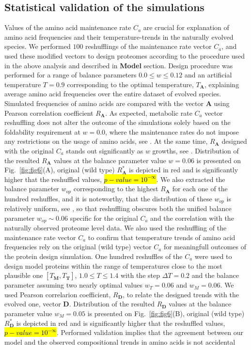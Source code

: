 \documentclass[10pt,letterpaper]{article}
\begin{document}
\subsection{Statistical validation of the simulations}
Values of the amino acid maintenance rate $C_{a}$ are crucial for explanation of amino acid frequencies and their temperature-trends in the naturally evolved species. We performed $100$ reshufflings of the maintenance rate vector $C_{a}$, and used these modified vectors to design proteomes according to the procedure used in the above analysis and described in {\bf Model} section. Design procedure was performed for a range of balance parameters $0.0\leq\mathit{w}\leq0.12$ and an artificial temperature $T=0.9$ corresponding to the optimal temperature, $T_{\mathbf{A}}$, explaining average amino acid frequencies over the entire dataset of evolved species. Simulated frequencies of amino acids are compared with the vector $\mathbf{A}$ using Pearson correlation coefficient $R_{\mathbf{A}}$. As expected, metabolic rate $C_{a}$ vector reshuffling does not alter the outcome of the simulations solely based on the foldability requirement at $\mathit{w}=0.0$, where the maintenance rates do not impose any restrictions on the usage of amino acids, see . At the same time, $R_{\mathbf{A}}$ designed with the original $C_{a}$ stands out significantly as $\mathit{w}$ growths, see . Distribution of the resulted $R_{\mathbf{A}}$ values at the balance parameter value $\mathit{w}=0.06$ is presented on Fig.~\ref{fig:fig6}(A), original (wild type) $R^{*}_{\mathbf{A}}$ is depicted in red and is significantly higher that the reshuffled values, \hl{$p-value=10^{-\infty}$}. We also extracted the balance parameter $\mathit{w}_{op}$ corresponding to the highest $R_{\mathbf{A}}$ for each one of the hundred reshuffles, and it is noteworthy, that the distribution of these $\mathit{w}_{op}$ is relatively uniform, see , so that reshuffling obscures both the unified balance parameter $\mathit{w}_{op}\sim0.06$ specific for the original $C_{a}$ and the correlation with the naturally observed proteome level data. We also used the reshuffling of the maintenance rate vector $C_{a}$ to confirm that temperature trends of amino acid frequencies rely on the original (wild type) vector $C_{a}$ for meaningfull outcomes of the protein design simulation. One hundred reshuffles of the $C_{a}$ were used to design model proteins within the range of temperatures close to the most plausible one $[T_\mathbf{M},T_\mathbf{T}]$, $1.0\leq T\leq1.4$ with the step $\Delta T=0.2$ and the balance parameter assuming two nearly optimal values $\mathit{w}_{T}=0.06$ and $\mathit{w}_{M}=0.06$. We used Pearson correlarion coefficient, $R_{\mathbf{D}}$, to relate the designed trends with the evolved one, vector $\mathbf{D}$. Distribution of the resulted $R_{\mathbf{D}}$ values at the balance parameter value $\mathit{w}_{M}=0.05$ is presented on Fig.~\ref{fig:fig6}(B), original (wild type) $R^{*}_{\mathbf{D}}$ is depicted in red and is significantly higher that the reshuffled values, \hl{$p-value=10^{-\infty}$}. Performed validation implies that the agreement between our model and the observed compositional trends in amino acids is not accidental 
\end{document}
